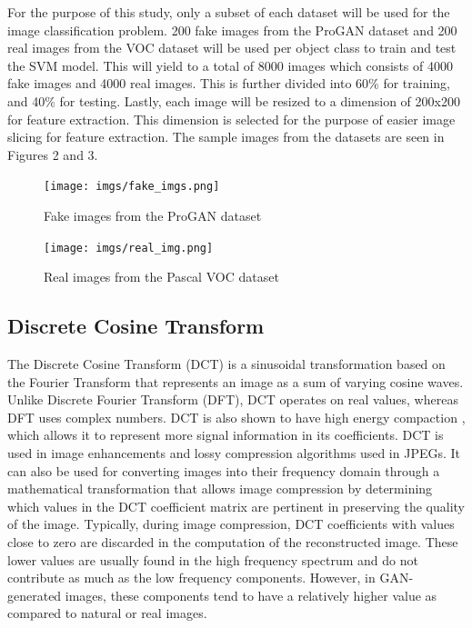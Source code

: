 \documentclass{icsthesis}
\begin{document}
\begin{mainmatter}
For the purpose of this study, only a subset of each dataset will be used for the image classification problem. 200 fake images from the ProGAN dataset and 200 real images from the VOC dataset will be used per object class to train and test the SVM model. This will yield to a total of 8000 images which consists of 4000 fake images and 4000 real images. This is further divided into 60\% for training, and 40\% for testing. Lastly, each image will be resized to a dimension of 200x200 for feature extraction. This dimension is selected for the purpose of easier image slicing for feature extraction. The sample images from the datasets are seen in Figures 2 and 3. 

\begin{figure}[ht]
    \centering
    \vspace{4ex}
	\texttt{[image: imgs/fake\_imgs.png]}
    \caption{Fake images from the ProGAN dataset}
    \label{fig:enter-label}
\end{figure}

\begin{figure}[ht]
    \centering
    \vspace{4ex}
	\texttt{[image: imgs/real\_img.png]}
    \caption{Real images from the Pascal VOC dataset}
    \label{fig:enter-label}
\end{figure}

\subsection{Discrete Cosine Transform}
The Discrete Cosine Transform (DCT) is a sinusoidal transformation based on the Fourier Transform that represents an image as a sum of varying cosine waves. Unlike Discrete Fourier Transform (DFT), DCT operates on real values, whereas DFT uses complex numbers. DCT is also shown to have high energy compaction \citep{dct-energy-compaction}, which allows it to represent more signal information in its coefficients. DCT is used in image enhancements and lossy compression algorithms used in JPEGs. It can also be used for converting images into their frequency domain through a mathematical transformation that allows image compression by determining which values in the DCT coefficient matrix are pertinent in preserving the quality of the image. Typically, during image compression, DCT coefficients with values close to zero are discarded in the computation of the reconstructed image. These lower values are usually found in the high frequency spectrum and do not contribute as much as the low frequency components. However, in GAN-generated images, these components tend to have a relatively higher value as compared to natural or real images. 



\end{mainmatter}
\end{document}
